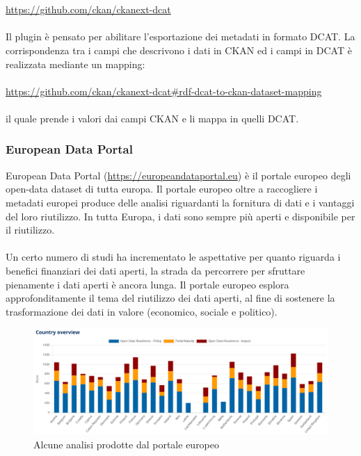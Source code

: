 \documentclass{article}
\theoremstyle{plain}
\theoremstyle{definition}
\begin{document}
\\
\\
\url{https://github.com/ckan/ckanext-dcat} 
\\
\\
Il plugin è pensato per abilitare l'esportazione dei metadati in formato DCAT. La corrispondenza tra i campi che descrivono i dati in CKAN ed i campi in DCAT è realizzata mediante un mapping:
\\
\\
\url{https://github.com/ckan/ckanext-dcat#rdf-dcat-to-ckan-dataset-mapping}
\\
\\
il quale prende i valori dai campi CKAN e li mappa in quelli DCAT.

\subsubsection{European Data Portal}
European Data Portal (\url{https://europeandataportal.eu}) è il portale europeo degli open-data dataset di tutta europa.
Il portale europeo oltre a raccogliere i metadati europei produce delle analisi riguardanti la fornitura di dati e i vantaggi del loro riutilizzo. In tutta Europa, i dati sono sempre più aperti e disponibile per il riutilizzo. 
\\
\\
Un certo numero di studi ha incrementato le aspettative per quanto riguarda i benefici finanziari dei dati aperti, la strada da percorrere per sfruttare pienamente i dati aperti è ancora lunga. Il portale europeo esplora approfonditamente il tema del riutilizzo dei dati aperti, al fine di sostenere la trasformazione dei dati in valore (economico, sociale e politico). 

\begin{figure}[htbp]
\begin{center}
\includegraphics[scale=0.50]{img/eustat.png}
\caption{Alcune analisi prodotte dal portale europeo}
\end{center}
\end{figure}
\end{document}
